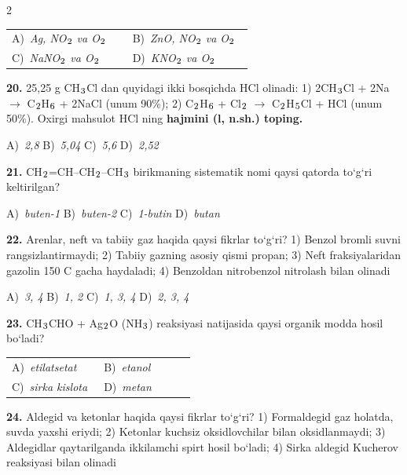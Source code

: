 \documentclass[11pt,a4paper]{article}
\renewcommand{\textsubscript}[1]{\ensuremath{_{\text{\fontsize{8}{8}\selectfont #1}}}}
\begin{document}
\begin{multicols}{2}
\noindent\begin{tabular}{@{}p{0.47\linewidth}@{}p{0.47\linewidth}@{}}
A)~\textsl{Ag, NO\textsubscript{2} va O\textsubscript{2}} & B)~\textsl{ZnO, NO\textsubscript{2} va O\textsubscript{2}} \\
C)~\textsl{NaNO\textsubscript{2} va O\textsubscript{2}} & D)~\textsl{KNO\textsubscript{2} va O\textsubscript{2}} \\
\end{tabular}\par
\vspace{4pt}
\noindent\textbf{20.} 25,25 g CH\textsubscript{3}Cl dan quyidagi ikki bosqichda HCl olinadi: 1) 2CH\textsubscript{3}Cl + 2Na $\to$ C\textsubscript{2}H\textsubscript{6} + 2NaCl (unum 90\%); 2) C\textsubscript{2}H\textsubscript{6} + Cl\textsubscript{2} $\to$ C\textsubscript{2}H\textsubscript{5}Cl + HCl (unum 50\%). Oxirgi mahsulot HCl ning \textbf{hajmini (l, n.sh.) toping.}

\noindent A)~\textsl{2,8} \hfill B)~\textsl{5,04} \hfill C)~\textsl{5,6} \hfill D)~\textsl{2,52}\par
\vspace{4pt}
\noindent\textbf{21.} CH\textsubscript{2}=CH--CH\textsubscript{2}--CH\textsubscript{3} birikmaning sistematik nomi qaysi qatorda to`g`ri keltirilgan?

\noindent A)~\textsl{buten-1} \hfill B)~\textsl{buten-2} \hfill C)~\textsl{1-butin} \hfill D)~\textsl{butan}\par
\vspace{4pt}
\noindent\textbf{22.} Arenlar, neft va tabiiy gaz haqida qaysi fikrlar to`g`ri? 1) Benzol bromli suvni rangsizlantirmaydi; 2) Tabiiy gazning asosiy qismi propan; 3) Neft fraksiyalaridan gazolin 150 \textdegree{}C gacha haydaladi; 4) Benzoldan nitrobenzol nitrolash bilan olinadi

\noindent A)~\textsl{3, 4} \hfill B)~\textsl{1, 2} \hfill C)~\textsl{1, 3, 4} \hfill D)~\textsl{2, 3, 4}\par
\vspace{4pt}
\noindent\textbf{23.} CH\textsubscript{3}CHO + Ag\textsubscript{2}O (NH\textsubscript{3}) reaksiyasi natijasida qaysi organik modda hosil bo`ladi?

\noindent\begin{tabular}{@{}p{0.47\linewidth}@{}p{0.47\linewidth}@{}}
A)~\textsl{etilatsetat} & B)~\textsl{etanol} \\
C)~\textsl{sirka kislota} & D)~\textsl{metan} \\
\end{tabular}\par
\vspace{4pt}
\noindent\textbf{24.} Aldegid va ketonlar haqida qaysi fikrlar to`g`ri? 1) Formaldegid gaz holatda, suvda yaxshi eriydi; 2) Ketonlar kuchsiz oksidlovchilar bilan oksidlanmaydi; 3) Aldegidlar qaytarilganda ikkilamchi spirt hosil bo`ladi; 4) Sirka aldegid Kucherov reaksiyasi bilan olinadi


\end{multicols}
\end{document}
